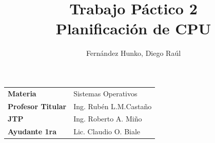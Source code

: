 \documentclass[a4paper]{article}
\title{\Huge{Trabajo P\'actico 2\\ Planif\mbox{}icaci\'on de CPU}}
\author{\Large{Fern\'andez Hunko, Diego Ra\'ul}}
\begin{document}
\maketitle
{}

\begin{tabular}{l l}
\textbf{\large{Materia}} & \large{Sistemas Operativos} \\
\textbf{\large{Profesor Titular}} & \large{Ing. Rub\'en L.M.Casta\~no} \\      
\textbf{\large{JTP}} & \large{Ing. Roberto A. Mi\~no} \\
\textbf{\large{Ayudante 1ra}} & \large{Lic. Claudio O. Biale} \\
\end{tabular}

\newpage
\end{document}
